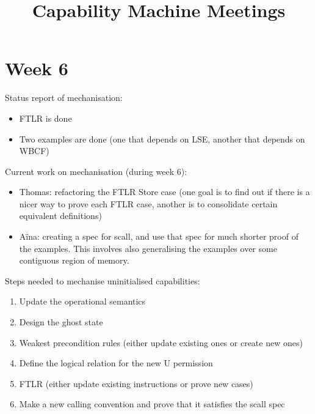 \documentclass{article}
\title{Capability Machine Meetings}
\begin{document}
\maketitle

\section{Week 6}

Status report of mechanisation: 

\begin{itemize}
\item FTLR is done
\item Two examples are done (one that depends on LSE, another that depends on WBCF)
\end{itemize}

Current work on mechanisation (during week 6): 

\begin{itemize}
\item Thomas: refactoring the FTLR Store case (one goal is to find out if there is a nicer way to prove each FTLR case, another is to consolidate certain equivalent definitions)
\item A\"{i}na: creating a spec for scall, and use that spec for much shorter proof of the examples. This involves also generalising the examples over some contiguous region of memory. 
\end{itemize}

Steps needed to mechanise uninitialised capabilities: 

\begin{enumerate}
\item Update the operational semantics
\item Design the ghost state
\item Weakest precondition rules (either update existing ones or create new ones) 
\item Define the logical relation for the new U permission
\item FTLR (either update existing instructions or prove new cases) 
\item Make a new calling convention and prove that it satisfies the scall spec
\end{enumerate}
\end{document}
